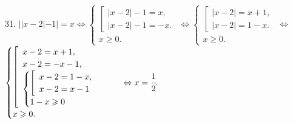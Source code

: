 31. $||x-2|-1|=x\Leftrightarrow\begin{cases}\left[\begin{array}{l}|x-2|-1=x,\\ |x-2|-1=-x.\end{array}\right.\\ x\geqslant0.\end{cases}
\Leftrightarrow\begin{cases}\left[\begin{array}{l}|x-2|=x+1,\\ |x-2|=1-x.\end{array}\right.\\ x\geqslant0.\end{cases}
\Leftrightarrow$\\$ \begin{cases}\left[\begin{array}{l}x-2=x+1,\\ x-2=-x-1,\\ \begin{cases}\left[\begin{array}{l}x-2=1-x,\\ x-2=x-1\end{array}\right.\\ 1-x\geqslant0\end{cases}\end{array}\right.\\ x\geqslant0.\end{cases}\Leftrightarrow x=\cfrac{1}{2}.$\\
